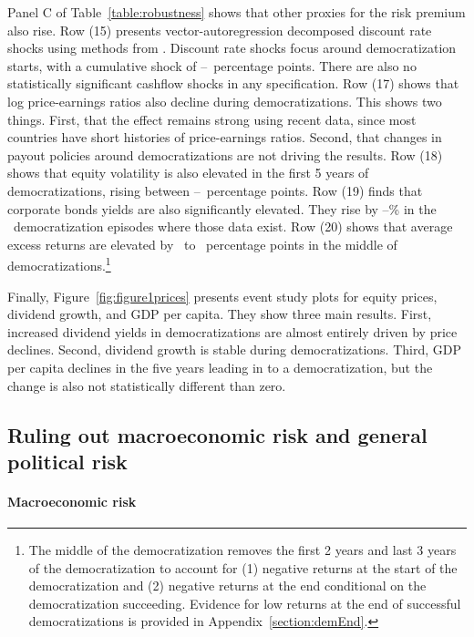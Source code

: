 Panel C of Table~\ref{table:robustness} shows that other proxies for the risk premium also rise. Row (15) presents vector-autoregression decomposed discount rate shocks using methods from \cite{Campbell1991}. Discount rate shocks focus around democratization starts, with a cumulative shock of \tabBThreeDRLow\---\tabBThreeDRHigh\ percentage points. There are also no statistically significant cashflow shocks in any specification. Row (17) shows that log price-earnings ratios also decline during democratizations. This shows two things. First, that the effect remains strong using recent data, since most countries have short histories of price-earnings ratios. Second, that changes in payout policies around democratizations are not driving the results. Row (18) shows that equity volatility is also elevated in the first 5 years of democratizations, rising between \tabBThreeEVolLow\---\tabBThreeEVolHigh\ percentage points. Row (19) finds that corporate bonds yields are also significantly elevated. They rise by \tabBThreeCorpBondLow\---\tabBThreeCorpBondHigh\% in the \tabBThreeCorpBondDem\ democratization episodes where those data exist. Row (20) shows that average excess returns are elevated by \tabBThreeExcRetLow\ to \tabBThreeExcRetHigh\ percentage points in the middle of democratizations.\footnote{The middle of the democratization removes the first 2 years and last 3 years of the democratization to account for (1) negative returns at the start of the democratization and (2) negative returns at the end conditional on the democratization succeeding. Evidence for low returns at the end of successful democratizations is provided in Appendix~\ref{section:demEnd}.}

Finally, Figure~\ref{fig:figure1prices} presents event study plots for equity prices, dividend growth, and GDP per capita. They show three main results. First, increased dividend yields in democratizations are almost entirely driven by price declines. Second, dividend growth is stable during democratizations. Third, GDP per capita declines in the five years leading in to a democratization, but the change is also not statistically different than zero.

\subsection{Ruling out macroeconomic risk and general political risk}\label{section:macropol}

\paragraph{Macroeconomic risk}

